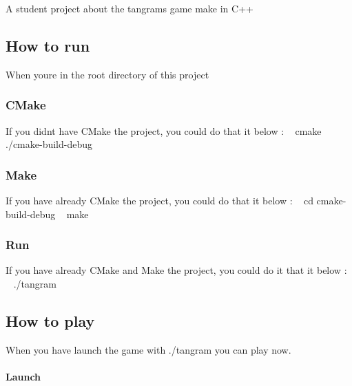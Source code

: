 A student project about the tangram\textquotesingle{}s game make in C++

\subsection*{How to run}

When you\textquotesingle{}re in the root directory of this project ~\newline
~\newline
 \subsubsection*{C\+Make}

If you didn\textquotesingle{}t have C\+Make the project, you could do that it below \+: ~\newline
 {\ttfamily cmake ./cmake-\/build-\/debug} \subsubsection*{Make}

If you have already C\+Make the project, you could do that it below \+: ~\newline
 {\ttfamily cd cmake-\/build-\/debug} ~\newline
 {\ttfamily make} ~\newline
 \subsubsection*{Run}

If you have already C\+Make and Make the project, you could do it that it below \+: ~\newline
 {\ttfamily ./tangram}

\subsection*{How to play}

When you have launch the game with {\ttfamily ./tangram} you can play now.

\paragraph*{Launch}

